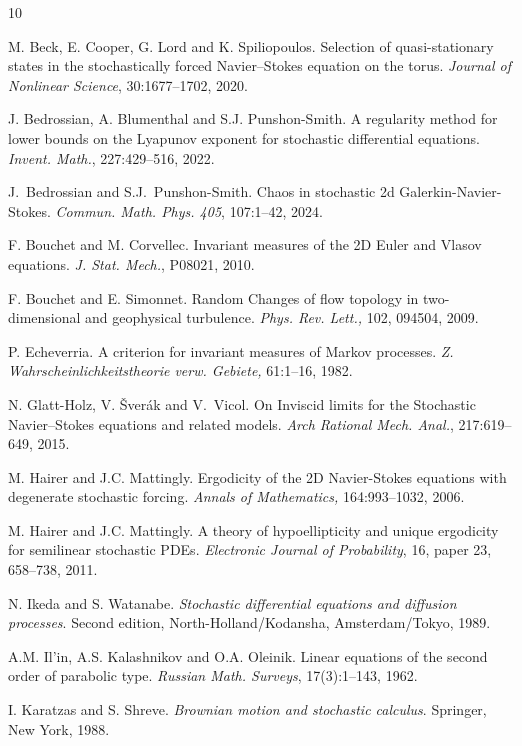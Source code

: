 \documentclass[12pt,leqno]{article}
\begin{document}
\begin{thebibliography}{10} 

 M. Beck, E. Cooper, G. Lord and K. Spiliopoulos. Selection of quasi-stationary states in the stochastically forced Navier–Stokes equation on the  torus. {\it Journal of Nonlinear Science}, 30:1677--1702, 2020.

 J. Bedrossian, A. Blumenthal and S.J. Punshon-Smith. A regularity method for lower bounds on the Lyapunov exponent for stochastic differential equations. {\it Invent. Math.}, 227:429--516, 2022.

 J.~Bedrossian and S.J.~Punshon-Smith. Chaos in stochastic 2d Galerkin-Navier-Stokes. {\it Commun. Math. Phys. 405}, 107:1--42, 2024.

 F. Bouchet and M. Corvellec. Invariant measures of the 2D Euler and Vlasov equations. {\it J. Stat. Mech.}, P08021, 2010.

 F. Bouchet and E. Simonnet. Random Changes of flow topology in two-dimensional and geophysical turbulence. {\it Phys. Rev. Lett.,} 102, 094504, 2009.

 P. Echeverria. A criterion for invariant measures of Markov processes. {\it Z. Wahrscheinlichkeitstheorie verw. Gebiete,} 61:1--16, 1982.

 N. Glatt-Holz, V. \v{S}ver\'ak and V.~Vicol. On Inviscid limits for the Stochastic Navier–Stokes equations and related models. {\it Arch Rational Mech. Anal.}, 217:619--649, 2015.

 M. Hairer and J.C. Mattingly. Ergodicity of the 2D Navier-Stokes equations with degenerate stochastic forcing.  {\it Annals of Mathematics,} 164:993--1032, 2006.

 M. Hairer and J.C. Mattingly. A theory of hypoellipticity and unique ergodicity for semilinear stochastic PDEs. {\it Electronic Journal of Probability}, 16, paper 23, 658--738, 2011.

 N. Ikeda and S. Watanabe. {\it Stochastic differential equations and diffusion processes}. Second edition,  North-Holland/Kodansha, Amsterdam/Tokyo, 1989.

 A.M. Il'in, A.S. Kalashnikov and O.A. Oleinik. Linear equations of the second order of parabolic type. {\it Russian Math. Surveys}, 17(3):1--143, 1962.

 I. Karatzas and S. Shreve. {\it Brownian motion and stochastic calculus}.  Springer, New York, 1988.


\end{thebibliography}
\end{document}
